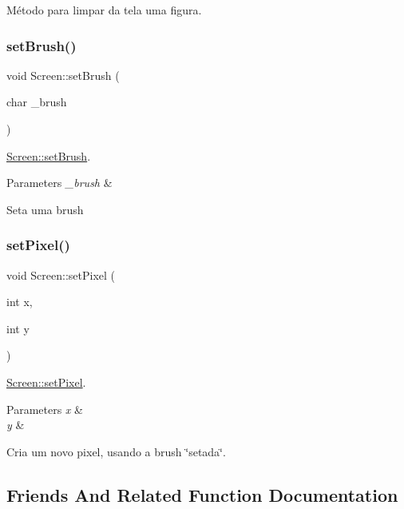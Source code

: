Método para limpar da tela uma figura. \mbox{\label{classScreen_aebc4eb6cb5acf15a0f04c1494622ab23}} 
\subsubsection{\texorpdfstring{set\+Brush()}{setBrush()}}
{\footnotesize\ttfamily void Screen\+::set\+Brush (\begin{DoxyParamCaption}\item[{char}]{\+\_\+brush }\end{DoxyParamCaption})}



\hyperlink{classScreen_aebc4eb6cb5acf15a0f04c1494622ab23}{Screen\+::set\+Brush}. 


\begin{DoxyParams}{Parameters}
{\em \+\_\+brush} & \\
\hline
\end{DoxyParams}
Seta uma brush \mbox{\label{classScreen_ae6bea81c57a22d226507c3c26fa95ee0}} 
\subsubsection{\texorpdfstring{set\+Pixel()}{setPixel()}}
{\footnotesize\ttfamily void Screen\+::set\+Pixel (\begin{DoxyParamCaption}\item[{int}]{x,  }\item[{int}]{y }\end{DoxyParamCaption})}



\hyperlink{classScreen_ae6bea81c57a22d226507c3c26fa95ee0}{Screen\+::set\+Pixel}. 


\begin{DoxyParams}{Parameters}
{\em x} & \\
\hline
{\em y} & \\
\hline
\end{DoxyParams}
Cria um novo pixel, usando a brush \char`\"{}setada\char`\"{}. 

\subsection{Friends And Related Function Documentation}
\mbox{\label{classScreen_aab6a2880746bfe1b7964817cc8f0989e}} 
